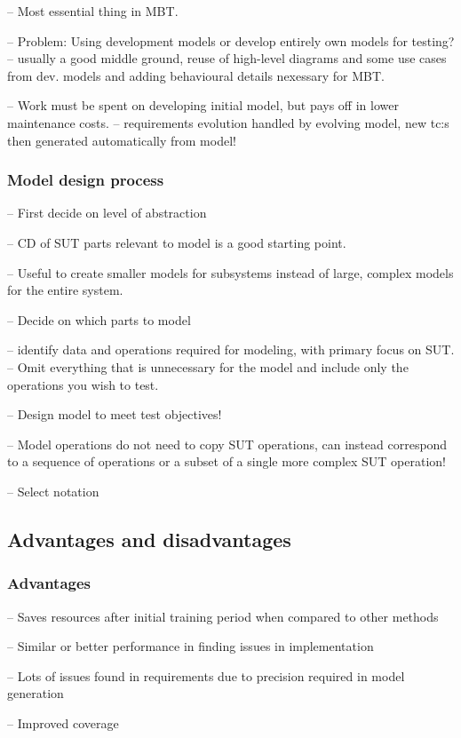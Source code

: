-- Most essential thing in MBT.

-- Problem: Using development models or develop entirely own models for testing? 
	-- usually a good middle ground, reuse of high-level diagrams and some use cases from dev. models and adding behavioural details nexessary for MBT.

-- Work must be spent on developing initial model, but pays off in lower maintenance costs.
	-- requirements evolution handled by evolving model, new tc:s then generated automatically from model! 
	
\subsubsection{Model design process}
-- First decide on level of abstraction

-- CD of SUT parts relevant to model is a good starting point.

-- Useful to create smaller models for subsystems instead of large, complex models for the entire system. 

-- Decide on which parts to model

-- identify data and operations required for modeling, with primary focus on SUT.
	-- Omit everything that is unnecessary for the model and include only the operations you wish to test.
	
-- Design model to meet test objectives!

-- Model operations do not need to copy SUT operations, can instead correspond to a sequence of operations or a subset of a single more complex SUT operation!

-- Select notation

\subsection{Advantages and disadvantages}

\subsubsection{Advantages}
-- Saves resources after initial training period when compared to other methods

-- Similar or better performance in finding issues in implementation

-- Lots of issues found in requirements due to precision required in model generation

-- Improved coverage

